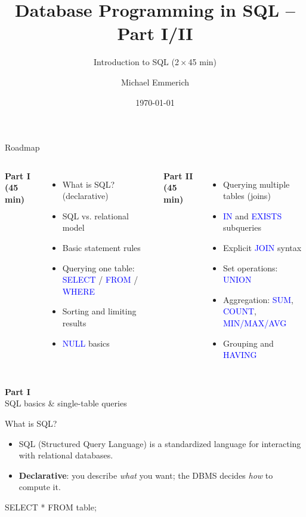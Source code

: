 \documentclass[10pt,aspectratio=169]{beamer}
\title{Database Programming in SQL -- Part I/II}
\subtitle{Introduction to SQL (2\,$\times$\,45 min)}
\author{Michael Emmerich}
\date{\today}
\newcommand{\sqlk}[1]{\textcolor{blue}{#1}}
\newcommand{\partslide}[2]{%
  \begin{frame}[plain]
    \vfill
    {\Huge\textbf{#1}}\\[0.6em]
    {\Large #2}
    \vfill
  \end{frame}
}
\begin{document}
\maketitle

\begin{frame}{Roadmap}
\begin{columns}[T,onlytextwidth]
\textbf{Part I (45 min)}
\begin{itemize}
  \item What is SQL? (declarative)
  \item SQL vs. relational model
  \item Basic statement rules
  \item Querying one table: \sqlk{SELECT} / \sqlk{FROM} / \sqlk{WHERE}
  \item Sorting and limiting results
  \item \sqlk{NULL} basics
\end{itemize}
\textbf{Part II (45 min)}
\begin{itemize}
  \item Querying multiple tables (joins)
  \item \sqlk{IN} and \sqlk{EXISTS} subqueries
  \item Explicit \sqlk{JOIN} syntax
  \item Set operations: \sqlk{UNION}
  \item Aggregation: \sqlk{SUM}, \sqlk{COUNT}, \sqlk{MIN/MAX/AVG}
  \item Grouping and \sqlk{HAVING}
\end{itemize}
\end{columns}
\end{frame}

\partslide{Part I}{SQL basics \& single-table queries}

\begin{frame}[fragile]{What is SQL?}
\begin{itemize}
  \item SQL (Structured Query Language) is a standardized language for interacting with relational databases.
  \item \textbf{Declarative}: you describe \emph{what} you want; the DBMS decides \emph{how} to compute it.
\end{itemize}
\vspace{0.7em}
\begin{codesql}
SELECT *
FROM table;
\end{codesql}
\end{frame}
\end{document}
